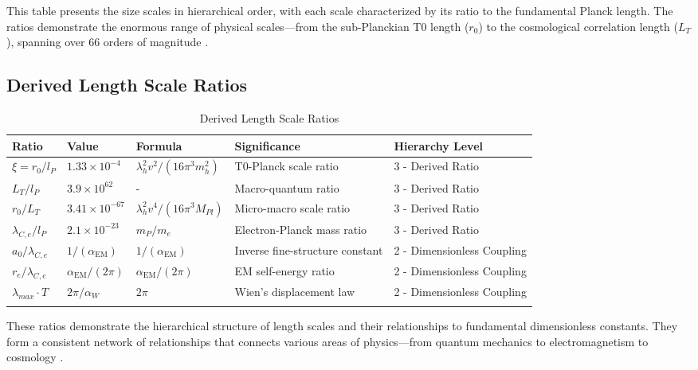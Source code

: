 \documentclass[12pt,a4paper]{article}
\newcommand{\alphaEM}{\alpha_{\text{EM}}}
\begin{document}
	This table presents the size scales in hierarchical order, with each scale characterized by its ratio to the fundamental Planck length. The ratios demonstrate the enormous range of physical scales—from the sub-Planckian T0 length ($r_0$) to the cosmological correlation length ($L_T$), spanning over 66 orders of magnitude \cite{pascher_emergente_2025}.
	
	\subsection{Derived Length Scale Ratios}
	
	\begin{table}[ht]
		\centering
		\begin{adjustbox}{scale=0.75}
			\begin{tabular}{lllll}
				\hline
				\textbf{Ratio} & \textbf{Value} & \textbf{Formula} & \textbf{Significance} & \textbf{Hierarchy Level} \\
				\hline
				$\xi = r_0/l_P$ & $1.33 \times 10^{-4}$ & $\lambda_h^2v^2/(16\pi^3m_h^2)$ & T0-Planck scale ratio & 3 - Derived Ratio \\
				$L_T/l_P$ & $3.9 \times 10^{62}$ & - & Macro-quantum ratio & 3 - Derived Ratio \\
				$r_0/L_T$ & $3.41 \times 10^{-67}$ & $\lambda_h^2v^4/(16\pi^3M_{Pl})$ & Micro-macro scale ratio & 3 - Derived Ratio \\
				$\lambda_{C,e}/l_P$ & $2.1 \times 10^{-23}$ & $m_P/m_e$ & Electron-Planck mass ratio & 3 - Derived Ratio \\
				$a_0/\lambda_{C,e}$ & $1/(\alphaEM)$ & $1/(\alphaEM)$ & Inverse fine-structure constant & 2 - Dimensionless Coupling \\
				$r_e/\lambda_{C,e}$ & $\alphaEM/(2\pi)$ & $\alphaEM/(2\pi)$ & EM self-energy ratio & 2 - Dimensionless Coupling \\
				$\lambda_{max} \cdot T$ & $2\pi/\alpha_W$ & $2\pi$ & Wien’s displacement law & 2 - Dimensionless Coupling \\
				\hline
				\multicolumn{4}{c}{} \\
				\hline
			\end{tabular}
		\end{adjustbox}
		\caption{Derived Length Scale Ratios}
		\label{tab:length_ratios}
	\end{table}
	
	These ratios demonstrate the hierarchical structure of length scales and their relationships to fundamental dimensionless constants. They form a consistent network of relationships that connects various areas of physics—from quantum mechanics to electromagnetism to cosmology \cite{pascher_planck_2025}.
	
\end{document}

